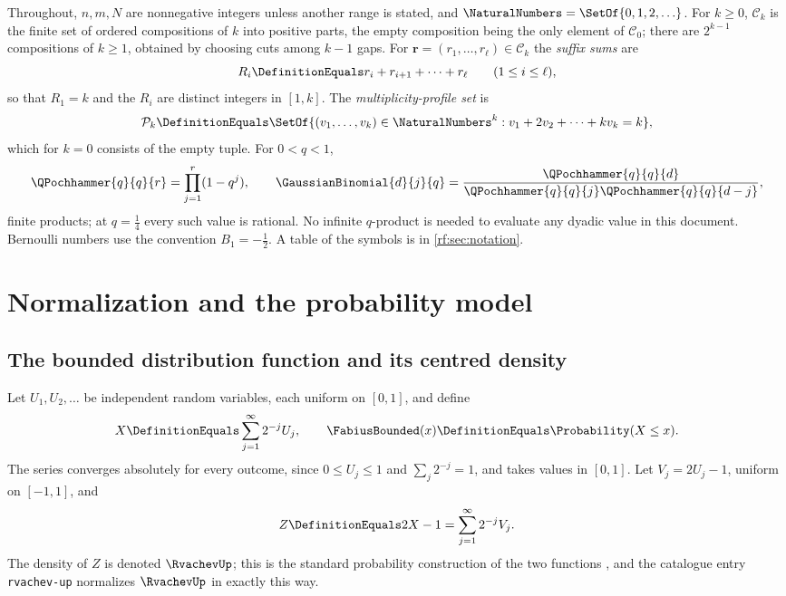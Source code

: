 \documentclass[11pt,oneside]{article}
\theoremstyle{plain}
\theoremstyle{definition}
\theoremstyle{remark}
\newcommand{\Fb}{\FabiusBounded}            %
\newcommand{\up}{\RvachevUp}                %
\newcommand{\Prob}{\Probability}
\newcommand{\qb}[3]{\GaussianBinomial{#1}{#2}{#3}}
\newcommand{\qp}[3]{\QPochhammer{#1}{#2}{#3}}
\newcommand{\Comp}[1]{\mathcal{C}_{#1}}     %
\newcommand{\Prof}[1]{\mathcal{P}_{#1}}     %
\begin{document}
Throughout, $n,m,N$ are nonnegative integers unless another range is
stated, and $\NaturalNumbers=\SetOf{0,1,2,\ldots}$.  For $k\ge0$, $\Comp{k}$
is the finite set of ordered compositions of $k$ into positive parts, the
empty composition being the only element of $\Comp{0}$; there are $2^{k-1}$
compositions of $k\ge1$, obtained by choosing cuts among $k-1$ gaps.  For
$\mathbf r=(r_{1},\ldots,r_{\ell})\in\Comp{k}$ the \emph{suffix sums} are
\begin{equation}
 R_{i}\DefinitionEquals r_{i}+r_{i+1}+\cdots+r_{\ell}\qquad(1\le i\le\ell),
 \label{rf:eq:intro-suffix}
\end{equation}
so that $R_{1}=k$ and the $R_{i}$ are distinct integers in $[1,k]$.  The
\emph{multiplicity-profile set} is
\begin{equation}
 \Prof{k}\DefinitionEquals
 \SetOf{(v_{1},\ldots,v_{k})\in\NaturalNumbers^{k}:
   v_{1}+2v_{2}+\cdots+kv_{k}=k},
 \label{rf:eq:intro-profiles}
\end{equation}
which for $k=0$ consists of the empty tuple.  For $0<q<1$,
\begin{equation}
 \qp{q}{q}{r}=\prod_{j=1}^{r}(1-q^{j}),\qquad
 \qb{d}{j}{q}=\frac{\qp{q}{q}{d}}{\qp{q}{q}{j}\qp{q}{q}{d-j}},
 \label{rf:eq:intro-q}
\end{equation}
finite products; at $q=\tfrac14$ every such value is rational.  No infinite
$q$-product is needed to evaluate any dyadic value in this document.
Bernoulli numbers use the convention $B_{1}=-\tfrac12$.  A table of the
symbols is in \cref{rf:sec:notation}.

\section{Normalization and the probability model}
\label{rf:sec:setup}

\subsection{The bounded distribution function and its centred density}
\label{rf:sec:setup-model}

Let $U_{1},U_{2},\ldots$ be independent random variables, each uniform on
$[0,1]$, and define
\begin{equation}
 X\DefinitionEquals\sum_{j=1}^{\infty}2^{-j}U_{j},\qquad
 \Fb(x)\DefinitionEquals\Prob(X\le x).
 \label{rf:eq:setup-X}
\end{equation}
The series converges absolutely for every outcome, since $0\le U_{j}\le1$
and $\sum_{j}2^{-j}=1$, and takes values in $[0,1]$.  Let $V_{j}=2U_{j}-1$,
uniform on $[-1,1]$, and
\begin{equation}
 Z\DefinitionEquals2X-1=\sum_{j=1}^{\infty}2^{-j}V_{j}.
 \label{rf:eq:setup-Z}
\end{equation}
The density of $Z$ is denoted $\up$; this is the standard probability
construction of the two functions \cite{arias1982,arias2018}, and the
catalogue entry \texttt{rvachev-up} normalizes $\up$ in exactly this way.
\end{document}
